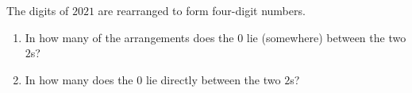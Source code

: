 The digits of $2021$ are rearranged to form four-digit numbers.
\begin{enumerate}
\item[(a)] In how many of the arrangements does the $0$ lie (somewhere) between the two $2$s?
\item[(b)] In how many does the $0$ lie directly between the two $2$s?
\end{enumerate}
